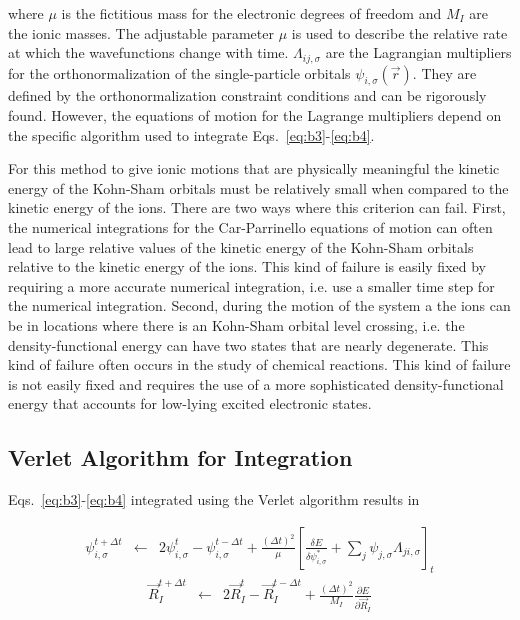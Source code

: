 \noindent
where $\mu$ is the fictitious mass for the electronic degrees of freedom and 
$M_I$ are the ionic masses.  
The adjustable parameter $\mu$ is used to 
describe the relative rate at which the wavefunctions change with time.  
$\Lambda_{ij,\sigma}$ are the 
Lagrangian multipliers for the orthonormalization of the single-particle 
orbitals $\psi_{i,\sigma}(\vec{r})$. 
They are defined by the orthonormalization constraint conditions
and can be rigorously found. 
However, the equations of motion for the Lagrange multipliers
depend on the specific algorithm used to integrate
Eqs.~\ref{eq:b3}-\ref{eq:b4}.

For this method to give ionic motions that are physically meaningful
the kinetic energy of the Kohn-Sham orbitals must be relatively
small when compared to the kinetic energy of the ions.
There are two ways where this criterion can fail.
First, the numerical integrations for the Car-Parrinello equations of motion 
can often lead to large relative values of the kinetic energy of 
the Kohn-Sham orbitals relative to the kinetic energy of the ions.
This kind of failure is easily fixed by requiring a more accurate
numerical integration, i.e. use a smaller time step for the numerical
integration.
Second, during the motion of the system a the ions can be in locations where
there is an Kohn-Sham orbital level crossing, i.e. the density-functional
energy can have two states that are nearly degenerate.  This kind
of failure often occurs in the study of chemical reactions.
This kind of failure is not easily fixed and requires the use
of a more sophisticated density-functional energy that accounts
for low-lying excited electronic states.


\subsection{Verlet Algorithm for Integration}

Eqs.~\ref{eq:b3}-\ref{eq:b4} integrated using the Verlet algorithm
results in

\begin{eqnarray}
\psi_{i,\sigma}^{t+ \Delta t} 
                   &\leftarrow& 
                    2 \psi_{i,\sigma}^{t} - \psi_{i,\sigma}^{t-\Delta t}
                      + \frac{(\Delta t)^2}{\mu}
                        \left[ 
                           \frac{\delta E}{\delta \psi_{i,\sigma}^{*}}
                            + \sum_{j} \psi_{j,\sigma} \Lambda_{ji,\sigma} 
                        \right]_{t}
\label{eq:b6}
\end{eqnarray}
\begin{eqnarray}
\vec{R}_I^{t+\Delta t} &\leftarrow& 
                    2 \vec{R}_I^{t} - \vec{R}_I^{t-\Delta t}
                    + \frac{(\Delta t)^2}{M_I} 
                       \frac{\partial E}{\partial \vec{R}_I}
\label{eq:b7}
\end{eqnarray}
               
